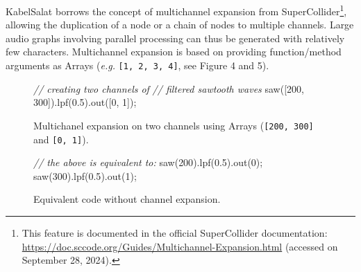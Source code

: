 \documentclass[11pt,]{article}
\newenvironment{Shaded}{}{}
\newcommand{\CommentTok}[1]{\textcolor[rgb]{0.38,0.63,0.69}{\textit{#1}}}
\newcommand{\DecValTok}[1]{\textcolor[rgb]{0.25,0.63,0.44}{#1}}
\newcommand{\FloatTok}[1]{\textcolor[rgb]{0.25,0.63,0.44}{#1}}
\newcommand{\FunctionTok}[1]{\textcolor[rgb]{0.02,0.16,0.49}{#1}}
\newcommand{\NormalTok}[1]{#1}
\newcommand{\OperatorTok}[1]{\textcolor[rgb]{0.40,0.40,0.40}{#1}}
\begin{document}
KabelSalat borrows the concept of multichannel expansion from
SuperCollider\footnote{This feature is documented in the official
  SuperCollider documentation:
  \url{https://doc.sccode.org/Guides/Multichannel-Expansion.html}
  (accessed on September 28, 2024).}, allowing the duplication of a node
or a chain of nodes to multiple channels. Large audio graphs involving
parallel processing can thus be generated with relatively few
characters. Multichannel expansion is based on providing function/method
arguments as Arrays (\emph{e.g.} \texttt{{[}1,\ 2,\ 3,\ 4{]}}, see
Figure 4 and 5).

\vspace{0.5em}
\setcounter{figure}{3}    
\begin{figure}[h!]
    \centering
    \begin{minipage}{0.40\textwidth}
        \begin{Shaded}
        \begin{Highlighting}[]
        \CommentTok{// creating two channels of}
        \CommentTok{// filtered sawtooth waves}
        \FunctionTok{saw}\NormalTok{([}\DecValTok{200}\OperatorTok{,} \DecValTok{300}\NormalTok{])}\OperatorTok{.}\FunctionTok{lpf}\NormalTok{(}\FloatTok{0.5}\NormalTok{)}\OperatorTok{.}\FunctionTok{out}\NormalTok{([}\DecValTok{0}\OperatorTok{,} \DecValTok{1}\NormalTok{])}\OperatorTok{;}
        \end{Highlighting}
        \end{Shaded}
        \caption{Multichanel expansion on two channels using Arrays (\texttt{[200, 300]} and \texttt{[0, 1]}).}
    \end{minipage}\hspace{0.1\textwidth}
    \begin{minipage}{0.40\textwidth}
        \centering
        \begin{Shaded}
        \begin{Highlighting}[]
        \CommentTok{// the above is equivalent to:}
        \FunctionTok{saw}\NormalTok{(}\DecValTok{200}\NormalTok{)}\OperatorTok{.}\FunctionTok{lpf}\NormalTok{(}\FloatTok{0.5}\NormalTok{)}\OperatorTok{.}\FunctionTok{out}\NormalTok{(}\DecValTok{0}\NormalTok{)}\OperatorTok{;}
        \FunctionTok{saw}\NormalTok{(}\DecValTok{300}\NormalTok{)}\OperatorTok{.}\FunctionTok{lpf}\NormalTok{(}\FloatTok{0.5}\NormalTok{)}\OperatorTok{.}\FunctionTok{out}\NormalTok{(}\DecValTok{1}\NormalTok{)}\OperatorTok{;}
        \end{Highlighting}
        \end{Shaded}
        \caption{Equivalent code without channel expansion.}
    \end{minipage}
\end{figure}
\end{document}
